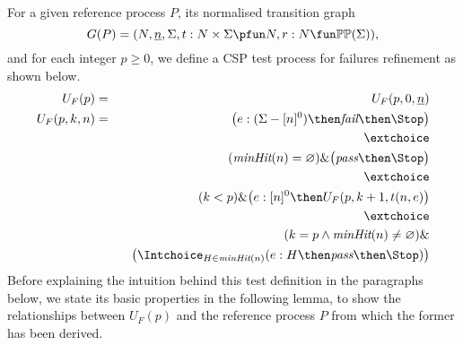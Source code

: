 For a given reference process $P$, its normalised transition graph 
$$
G(P) = ( N, \ii n, \Sigma, t : N\times\Sigma \pfun N, r : N \fun \mathbb{P}\mathbb{P}(\Sigma)),
$$ 
and for each integer $p\ge 0$, we define a
CSP test process for failures refinement as shown below.
%
%
\begin{eqnarray}
\label{eq:UFP}
U_F(p) & = & U_F(p,0,\ii n)
\\
U_F(p,k,n) & = & \big(e:(\Sigma - [n]^0)  \then \efail\then \Stop \big)
\label{eq:ufa}
\\ & & \extchoice \nonumber
\\ & & (\minhits(n) =   \varnothing  )    \&   \big( \epass \then \Stop \big)
\label{eq:ufb}
\\ & & \extchoice \nonumber
\\ & & (k < p) \& \big(e:[n]^0   \then U_F(p,k+1,t(n,e) \big)
\label{eq:ufc}
\\ & & \extchoice \nonumber
\\ & & (k = p \wedge \minhits(n)\neq\varnothing) \&  \nonumber 
\\ & & \taba \big( \Intchoice_{H\in\minhits(n)} (e:H   \then \epass \then\Stop   )  \big)
\label{eq:ufd}
\end{eqnarray}
%
Before explaining the intuition behind this test definition in the paragraphs below,
we state its basic properties in the following lemma, to show the relationships between
$U_F(p)$ and the reference process $P$ from which the former has been derived.

